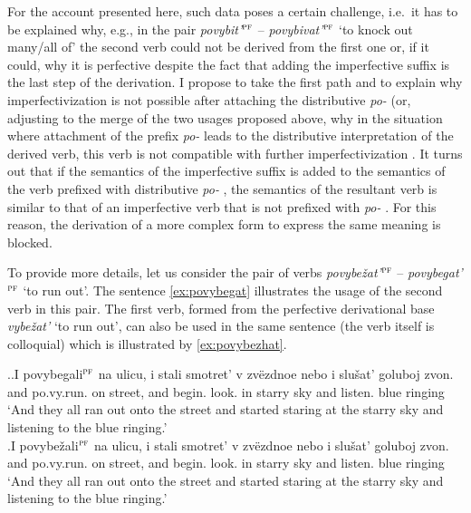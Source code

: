 For the account presented here, such data poses a certain challenge, i.e.\ it has to be explained why, e.g., in the pair \textit{povybit'}$^{\textsc{pf}}$ -- \textit{povybivat'}$^{\textsc{pf}}$ `to knock out many/all of' the second verb could not be derived from the first one or, if it could, why it is perfective despite the fact that adding the imperfective suffix   is the last step of the derivation. I propose to take the first path and to explain why imperfectivization  is not possible after attaching the distributive  \textit{po-}   (or, adjusting to the merge of the two usages proposed above, why in the situation where attachment of the prefix \textit{po-}   leads to the distributive  interpretation of the derived verb, this verb is not compatible with further imperfectivization . It turns out that if the semantics of the imperfective suffix   is added to the semantics of the verb prefixed with distributive  \textit{po-}  , the semantics of the resultant verb is similar to that of an imperfective verb  that is not prefixed with \textit{po-}  . For this reason, the derivation of a more complex form to express the same meaning is blocked.

To provide more details, let us consider the pair of verbs \textit{povybe\v{z}at'}$^{\textsc{pf}}$ -- \textit{po\-vy\-be\-gat'}$^{\textsc{pf}}$ `to run out'. The sentence \ref{ex:povybegat} illustrates the usage of the second verb in this pair. The first verb, formed from the perfective derivational base \textit{vybe\v{z}at'} `to run out', can also be used in the same sentence (the verb itself is colloquial) which is illustrated by \ref{ex:povybezhat}.

\ex.\label{ex:povy}\ag.\label{ex:povybegat}I povybegali$^{\textsc{pf}}$ na ulicu, i stali smotret' v zv\"{e}zdnoe nebo i slu\v{s}at' goluboj zvon.\\
and po.vy.run. on street, and begin. look. in starry sky and listen. blue ringing\\
\trans `And they all ran out onto the street and started staring at the starry sky and listening to the blue ringing.'\\
\bg.\label{ex:povybezhat}I povybe\v{z}ali$^{\textsc{pf}}$ na ulicu, i stali smotret' v zv\"{e}zdnoe nebo i slu\v{s}at' goluboj zvon.\\
and po.vy.run. on street, and begin. look. in starry sky and listen. blue ringing\\
\trans `And they all ran out onto the street and started staring at the starry sky and listening to the blue ringing.'

